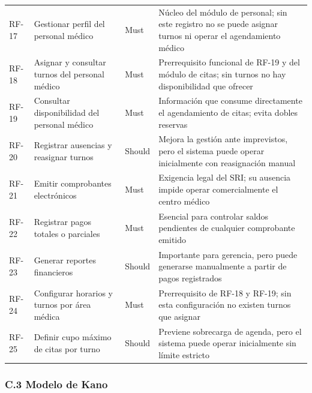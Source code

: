 \documentclass[11pt,a4paper]{article}
\begin{document}
\begin{longtable}{p{} p{} p{} p{}}
		RF-17 & Gestionar perfil del personal médico & Must & Núcleo del módulo de personal; sin este registro no se puede asignar turnos ni operar el agendamiento médico \\
		RF-18 & Asignar y consultar turnos del personal médico & Must & Prerrequisito funcional de RF-19 y del módulo de citas; sin turnos no hay disponibilidad que ofrecer \\
		RF-19 & Consultar disponibilidad del personal médico & Must & Información que consume directamente el agendamiento de citas; evita dobles reservas \\
		RF-20 & Registrar ausencias y reasignar turnos & Should & Mejora la gestión ante imprevistos, pero el sistema puede operar inicialmente con reasignación manual \\
		RF-21 & Emitir comprobantes electrónicos & Must & Exigencia legal del SRI; su ausencia impide operar comercialmente el centro médico \\
		RF-22 & Registrar pagos totales o parciales & Must & Esencial para controlar saldos pendientes de cualquier comprobante emitido \\
		RF-23 & Generar reportes financieros & Should & Importante para gerencia, pero puede generarse manualmente a partir de pagos registrados \\
		RF-24 & Configurar horarios y turnos por área médica & Must & Prerrequisito de RF-18 y RF-19; sin esta configuración no existen turnos que asignar \\
		RF-25 & Definir cupo máximo de citas por turno & Should & Previene sobrecarga de agenda, pero el sistema puede operar inicialmente sin límite estricto \\
	\end{longtable}
	
	\subsubsection{C.3 Modelo de Kano}
	
\end{document}
